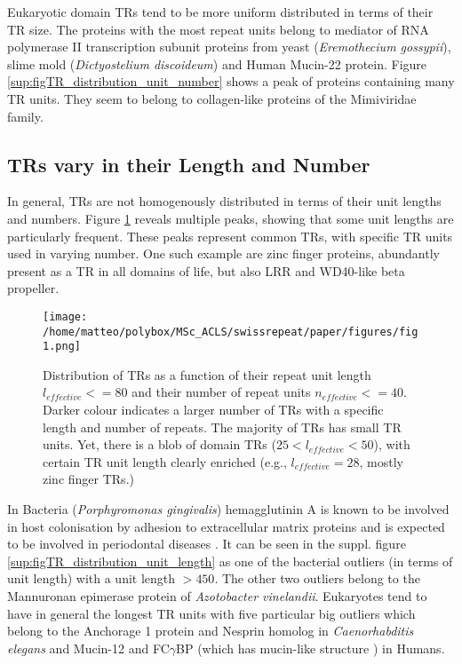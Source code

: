 \documentclass[a4,center,fleqn]{NAR}
\begin{document}
Eukaryotic domain TRs tend to be more uniform distributed in terms of their TR size. The proteins with the most repeat units belong to mediator of RNA polymerase II transcription subunit proteins from yeast (\textit{Eremothecium gossypii}), slime mold (\textit{Dictyostelium discoideum}) and Human Mucin-22 protein.
Figure \ref{sup:figTR_distribution_unit_number} shows a peak of proteins containing many TR units. They seem to belong to collagen-like proteins of the Mimiviridae family.

\subsection{TRs vary in their Length and Number}
In general, TRs are not homogenously distributed in terms of their unit lengths and numbers. Figure \ref{fig1} reveals multiple peaks, showing that some unit lengths are particularly frequent. These peaks represent common TRs, with specific TR units used in varying number.  
One such example are zinc finger proteins, abundantly present as a TR in all domains of life, but also LRR and WD40-like beta propeller.

\begin{figure}[t]
\begin{center}
\texttt{[image: /home/matteo/polybox/MSc\_ACLS/swissrepeat/paper/figures/fig1.png]}
\end{center}
\caption{Distribution of TRs as a function of their repeat unit length $l_{effective} <= 80$ and their number of repeat units $n_{effective} <= 40$. Darker colour indicates a larger number of TRs with a specific length and number of repeats. The majority of TRs has small TR units. Yet, there is a blob of domain TRs ($25 < l_{effective} < 50$), with certain TR unit length clearly enriched (e.g., $l_{effective} = 28$, mostly zinc finger TRs.)}
\label{fig1}
\end{figure}

In Bacteria (\textit{Porphyromonas gingivalis}) hemagglutinin A is known to be involved in host colonisation by adhesion to extracellular matrix proteins and is expected to be involved in periodontal diseases \cite{Nelson2003, Han1996}. 
It can be seen in the suppl. figure \ref{sup:figTR_distribution_unit_length} as one of the bacterial outliers (in terms of unit length) with a unit length $>450$. The other two outliers belong to the Mannuronan epimerase protein of \textit{Azotobacter vinelandii}.
Eukaryotes tend to have in general the longest TR units with five particular big outliers which belong to the Anchorage 1 protein and Nesprin homolog in \textit{Caenorhabditis elegans} and Mucin-12 
and FC$\gamma$BP (which has mucin-like structure \cite{Harada1997}) in Humans. 
\end{document}
